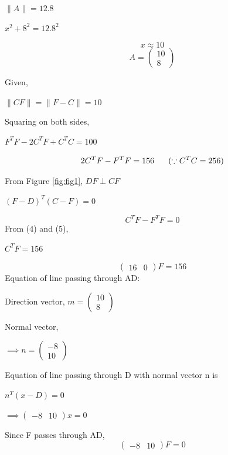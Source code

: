 \documentclass[letterpaper,12pt]{article}
\begin{document}
\clearpage

\begin{center}
    $\|A\| = 12.8$
\end{center}
\begin{center}
    $x^2 + 8^2 = 12.8^2$
\end{center}
\begin{equation}
    x \approx 10
\end{equation}
\begin{equation}
    A = \begin{pmatrix} 10 \\ 8 \end{pmatrix}
\end{equation}

Given,
\begin{center}
    $\|CF\| = \|F - C\| = 10$
\end{center}
Squaring on both sides,
\begin{center}
    $F^TF - 2C^TF + C^TC = 100$
\end{center}
\begin{equation}
    2C^TF - F^TF = 156 \hspace{0.6cm} (\because C^TC = 256)
\end{equation}

From Figure \ref{fig:fig1}, $DF \perp CF$
\begin{center}
    $(F-D)^T(C-F) = 0$
\end{center}
\begin{equation}
    C^TF - F^TF = 0
\end{equation}
From (4) and (5),
\begin{center}
    $C^TF = 156$
\end{center}
\begin{equation}
    \begin{pmatrix} 16 & 0 \end{pmatrix}F = 156
\end{equation}
Equation of line passing through AD:
\begin{center}
    Direction vector, $m = \begin{pmatrix} 10 \\ 8 \end{pmatrix}$
\end{center}
Normal vector,
\begin{center}
    $\implies n = \begin{pmatrix} -8 \\ 10 \end{pmatrix}$
\end{center}
Equation of line passing through D with normal vector n is
\begin{center}
    $n^T(x - D) = 0$
\end{center}
\begin{center}
    $\implies \begin{pmatrix} -8 & 10 \end{pmatrix}x = 0$
\end{center}
Since F passes through AD,
\begin{equation}
    \begin{pmatrix} -8 & 10 \end{pmatrix}F = 0
\end{equation}
\end{document}
